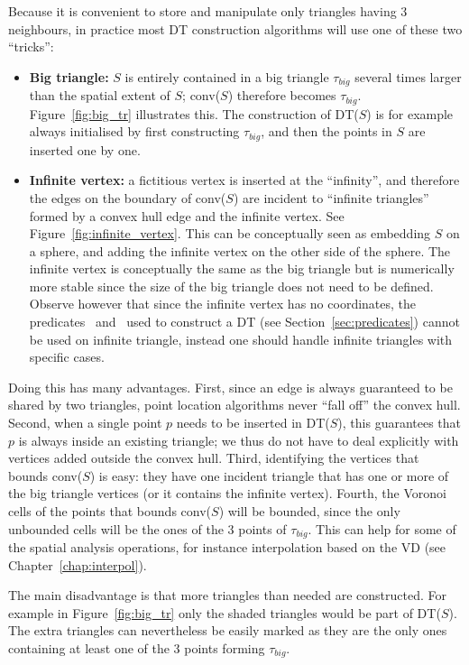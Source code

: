 Because it is convenient to store and manipulate only triangles having 3 neighbours, in practice most DT construction algorithms will use one of these two ``tricks'':
\begin{itemize}
  \item \textbf{Big triangle:} $S$ is entirely contained in a big triangle $\tau_{big}$ several times larger than the spatial extent of $S$; conv($S$) therefore becomes $\tau_{big}$. 
  Figure~\ref{fig:big_tr} illustrates this.
  The construction of DT($S$) is for example always initialised by first constructing $\tau_{big}$, and then the points in $S$ are inserted one by one. 
  \item \textbf{Infinite vertex:} a fictitious vertex is inserted at the ``infinity'', and therefore the edges on the boundary of conv($S$) are incident to ``infinite triangles'' formed by a convex hull edge and the infinite vertex. See Figure~\ref{fig:infinite_vertex}.
  This can be conceptually seen as embedding $S$ on a sphere, and adding the infinite vertex on the other side of the sphere.
  The infinite vertex is conceptually the same as the big triangle but is numerically more stable since the size of the big triangle does not need to be defined.
  Observe however that since the infinite vertex has no coordinates, the predicates \Orient\ and \Incircle\ used to construct a DT (see Section~\ref{sec:predicates}) cannot be used on infinite triangle, instead one should handle infinite triangles with specific cases.
\end{itemize}

%

Doing this has many advantages. 
First, since an edge is always guaranteed to be shared by two triangles, point location algorithms never ``fall off'' the convex hull. 
Second, when a single point $p$ needs to be inserted in DT($S$), this guarantees that $p$ is always inside an existing triangle; we thus do not have to deal explicitly with vertices added outside the convex hull. 
Third, identifying the vertices that bounds conv($S$) is easy: they have one incident triangle that has one or more of the big triangle vertices (or it contains the infinite vertex).
Fourth, the Voronoi cells of the points that bounds conv($S$) will be bounded, since the only unbounded cells will be the ones of the 3 points of $\tau_{big}$. 
This can help for some of the spatial analysis operations, for instance interpolation based on the VD (see Chapter~\ref{chap:interpol}).

%

The main disadvantage is that more triangles than needed are constructed. 
For example in Figure~\ref{fig:big_tr} only the shaded triangles would be part of DT($S$). 
The extra triangles can nevertheless be easily marked as they are the only ones containing at least one of the 3 points forming $\tau_{big}$. 

